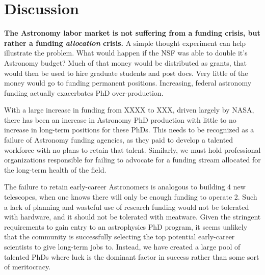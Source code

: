 \documentclass[preprint2]{aastex}
\begin{document}



\section{Discussion}

{\bf{The Astronomy labor market is not suffering from a funding crisis, but rather a funding {\emph{allocation}} crisis.}} A simple thought experiment can help illustrate the problem. What would happen if the NSF was able to double it's Astronomy budget? Much of that money would be distributed as grants, that would then be used to hire graduate students and post docs. Very little of the money would go to funding permanent positions. Increasing, federal astronomy funding actually exacerbates PhD over-production. 

With a large increase in funding from XXXX to XXX, driven largely by NASA, there has been an increase in Astronomy PhD production with little to no increase in long-term positions for these PhDs.  This needs to be recognized as a failure of Astronomy funding agencies, as they paid to develop a talented workforce with no plans to retain that talent. Similarly, we must hold professional organizations responsible for failing to advocate for a funding stream allocated for the long-term health of the field.  

The failure to retain early-career Astronomers is analogous to building 4 new telescopes, when one knows there will only be enough funding to operate 2.  Such a lack of planning and wasteful use of research funding would not be tolerated with hardware, and it should not be tolerated with meatware. Given the stringent requirements to gain entry to an astrophysics PhD program, it seems unlikely that the community is successfully selecting the top potential early-career scientists to give long-term jobs to. Instead, we have created a large pool of talented PhDs where luck is the dominant factor in success rather than some sort of meritocracy. 
\end{document}
